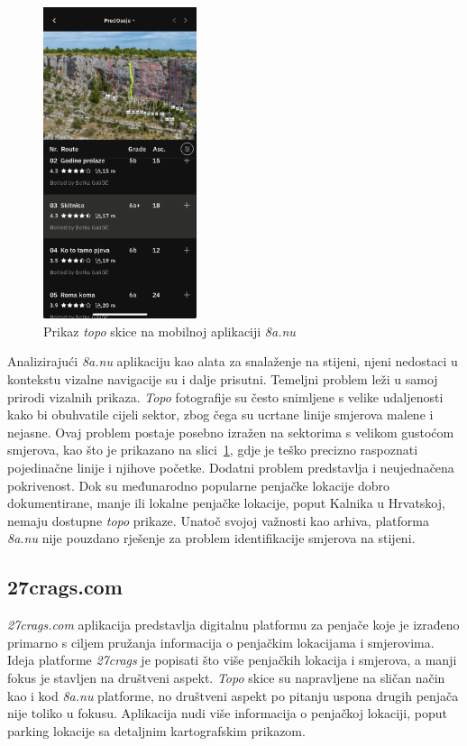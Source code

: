 \begin{figure}[H]
    \centering
    \includegraphics[width=0.4\textwidth]{images/analiza/8anu_mobile.jpg}
    \caption{Prikaz \textit{topo} skice na mobilnoj aplikaciji \textit{8a.nu}}
    \label{fig:8anu_mobile}
\end{figure}


Analizirajući \textit{8a.nu} aplikaciju kao alata za snalaženje na stijeni, njeni nedostaci u kontekstu vizalne navigacije su i dalje prisutni. Temeljni problem leži u samoj prirodi vizalnih prikaza. \textit{Topo} fotografije su često snimljene s velike udaljenosti kako bi obuhvatile cijeli sektor, zbog čega su ucrtane linije smjerova malene i nejasne. Ovaj problem postaje posebno izražen na sektorima s velikom gustoćom smjerova, kao što je prikazano na slici~\ref{fig:8anu_mobile}, gdje je teško precizno raspoznati pojedinačne linije i njihove početke. Dodatni problem predstavlja i neujednačena pokrivenost. Dok su međunarodno popularne penjačke lokacije dobro dokumentirane, manje ili lokalne penjačke lokacije, poput Kalnika u Hrvatskoj, nemaju dostupne \textit{topo} prikaze. Unatoč svojoj važnosti kao arhiva, platforma \textit{8a.nu} nije pouzdano rješenje za problem identifikacije smjerova na stijeni.

\subsection{27crags.com}

\textit{27crags.com} aplikacija predstavlja digitalnu platformu za penjače koje je izrađeno primarno s ciljem pružanja informacija o penjačkim lokacijama i smjerovima. Ideja platforme \textit{27crags} je popisati što više penjačkih lokacija i smjerova, a manji fokus je stavljen na društveni aspekt. \textit{Topo} skice su napravljene na sličan način kao i kod \textit{8a.nu} platforme, no društveni aspekt po pitanju uspona drugih penjača nije toliko u fokusu. Aplikacija nudi više informacija o penjačkoj lokaciji, poput parking lokacije sa detaljnim kartografskim prikazom.

